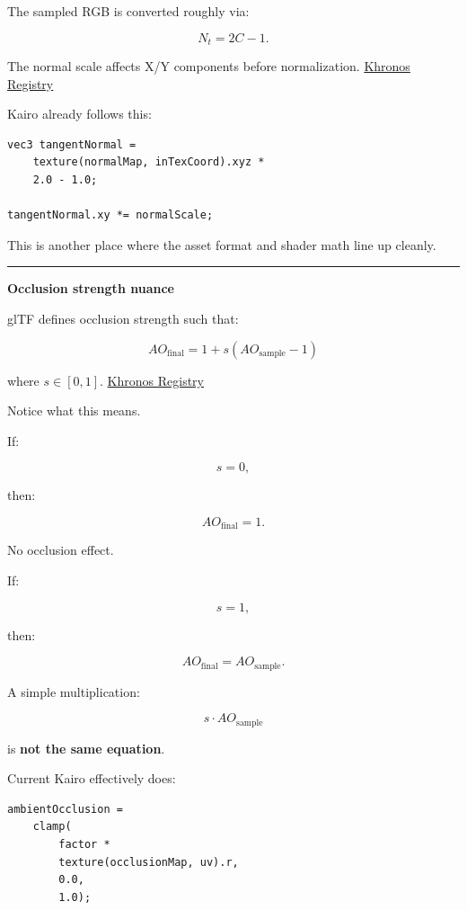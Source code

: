 The sampled RGB is converted roughly via:

\[
N_t=2C-1.
\]

The normal scale affects X/Y components before normalization. \href{https://registry.khronos.org/glTF/specs/2.0/glTF-2.0.pdf?utm_source=chatgpt.com}{Khronos Registry}

Kairo already follows this:

\begin{verbatim}
vec3 tangentNormal =
    texture(normalMap, inTexCoord).xyz *
    2.0 - 1.0;

tangentNormal.xy *= normalScale;
\end{verbatim}

This is another place where the asset format and shader math line up cleanly.

\begin{center}\rule{0.5\linewidth}{0.5pt}\end{center}

\textbf{Occlusion strength nuance}

glTF defines occlusion strength such that:

\[
\boxed{
AO_{\text{final}}
=
1+
s(AO_{\text{sample}}-1)
}
\]

where \(s\in[0,1]\). \href{https://registry.khronos.org/glTF/specs/2.0/glTF-2.0.html?initialSessionID=262-7493612-7323838&ld=ASXXSCTFRDirect&utm_source=chatgpt.com}{Khronos Registry}

Notice what this means.

If:

\[
s=0,
\]

then:

\[
AO_{\text{final}}=1.
\]

No occlusion effect.

If:

\[
s=1,
\]

then:

\[
AO_{\text{final}}
=
AO_{\text{sample}}.
\]

A simple multiplication:

\[
s\cdot AO_{\text{sample}}
\]

is \textbf{not the same equation}.

Current Kairo effectively does:

\begin{verbatim}
ambientOcclusion =
    clamp(
        factor *
        texture(occlusionMap, uv).r,
        0.0,
        1.0);
\end{verbatim}

